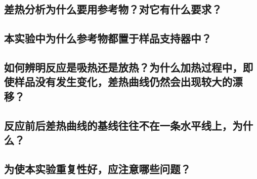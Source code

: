 \documentclass[a4paper]{article}
\begin{document}
\subsection{差热分析为什么要用参考物？对它有什么要求？}
\subsection{本实验中为什么参考物都置于样品支持器中？}
\subsection{如何辨明反应是吸热还是放热？为什么加热过程中，即使样品没有发生变化，差热曲线仍然会出现较大的漂移？}
\subsection{反应前后差热曲线的基线往往不在一条水平线上，为什么？}
\subsection{为使本实验重复性好，应注意哪些问题？}

\nocite{jiaocai}

\end{document}
